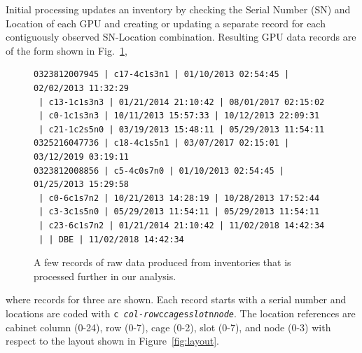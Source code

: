 Initial processing updates an inventory by checking the Serial Number
(SN) and Location of each GPU and creating or updating a separate
record for each contiguously observed SN-Location
combination. Resulting GPU data records are of the form shown in
Fig.~\ref{fig:dataraw},
\begin{figure}[tb]
{\tiny
\begin{verbatim}
0323812007945 | c17-4c1s3n1 | 01/10/2013 02:54:45 | 02/02/2013 11:32:29
 | c13-1c1s3n3 | 01/21/2014 21:10:42 | 08/01/2017 02:15:02
 | c0-1c1s3n3 | 10/11/2013 15:57:33 | 10/12/2013 22:09:31
 | c21-1c2s5n0 | 03/19/2013 15:48:11 | 05/29/2013 11:54:11
0325216047736 | c18-4c1s5n1 | 03/07/2017 02:15:01 | 03/12/2019 03:19:11
0323812008856 | c5-4c0s7n0 | 01/10/2013 02:54:45 | 01/25/2013 15:29:58
 | c0-6c1s7n2 | 10/21/2013 14:28:19 | 10/28/2013 17:52:44
 | c3-3c1s5n0 | 05/29/2013 11:54:11 | 05/29/2013 11:54:11
 | c23-6c1s7n2 | 01/21/2014 21:10:42 | 11/02/2018 14:42:34
 | | DBE | 11/02/2018 14:42:34
\end{verbatim}
}
\caption{A few records of raw data produced from inventories that is
  processed further in our analysis.}
\label{fig:dataraw}
\end{figure}
where records for three are shown. Each record starts
with a serial number and locations are coded with {\tt c{\it
    col-row}c{\it cage}s{\it slot}n{\it node}}. The location
references are cabinet column (0-24), row (0-7), cage (0-2), slot
(0-7), and node (0-3) with respect to the layout shown in
Figure~\ref{fig:layout}.
